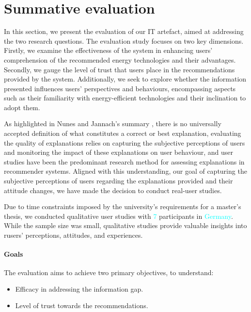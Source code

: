 \chapter{Summative evaluation}

In this section, we present the evaluation of our IT artefact, aimed at addressing the two research questions.
The evaluation study focuses on two key dimensions. 
Firstly, we examine the effectiveness of the system in enhancing users' comprehension of the recommended energy technologies and their advantages. 
Secondly, we gauge the level of trust that users place in the recommendations provided by the system. 
Additionally, we seek to explore whether the information presented influences users' perspectives and behaviours, 
encompassing aspects such as their familiarity with energy-efficient technologies and their inclination to adopt them. 

As highlighted in Nunes and Jannach's summary \cite{Nunes2020}, 
there is no universally accepted definition of what constitutes a correct or best explanation, 
evaluating the quality of explanations relies on capturing the subjective perceptions of users and monitoring the impact of these explanations on user behaviour, 
and user studies have been the predominant research method for assessing explanations in recommender systems.
Aligned with this understanding, our goal of capturing the subjective perceptions of users regarding the explanations provided and their attitude changes, 
we have made the decision to conduct real-user studies. 

Due to time constraints imposed by the university's requirements for a master's thesis, we conducted qualitative user studies with \textcolor{cyan}{7} participants in \textcolor{cyan}{Germany}. 
While the sample size was small, qualitative studies provide valuable insights into rusers' perceptions, attitudes, and experiences.


\subsubsection{Goals}

The evaluation aims to achieve two primary objectives, to understand: 
\begin{itemize}
  \item Efficacy in addressing the information gap.
  \item Level of trust towards the recommendations.
\end{itemize}


